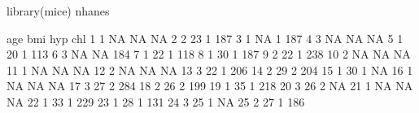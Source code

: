 \begin{Schunk}
\begin{Sinput}
 library(mice)
 nhanes
\end{Sinput}
\begin{Soutput}
   age bmi hyp chl
1    1  NA  NA  NA
2    2  23   1 187
3    1  NA   1 187
4    3  NA  NA  NA
5    1  20   1 113
6    3  NA  NA 184
7    1  22   1 118
8    1  30   1 187
9    2  22   1 238
10   2  NA  NA  NA
11   1  NA  NA  NA
12   2  NA  NA  NA
13   3  22   1 206
14   2  29   2 204
15   1  30   1  NA
16   1  NA  NA  NA
17   3  27   2 284
18   2  26   2 199
19   1  35   1 218
20   3  26   2  NA
21   1  NA  NA  NA
22   1  33   1 229
23   1  28   1 131
24   3  25   1  NA
25   2  27   1 186
\end{Soutput}
\end{Schunk}
